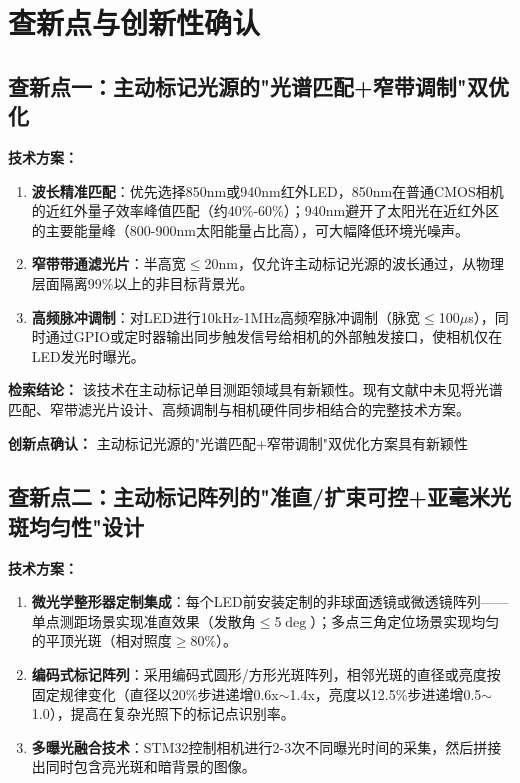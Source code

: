 \documentclass[12pt, a4paper]{ctexart}
\begin{document}
\section{查新点与创新性确认}

\subsection{查新点一：主动标记光源的"光谱匹配+窄带调制"双优化}

\textbf{技术方案：}

\begin{enumerate}
\item \textbf{波长精准匹配}：优先选择850nm或940nm红外LED，850nm在普通CMOS相机的近红外量子效率峰值匹配（约40\%-60\%）；940nm避开了太阳光在近红外区的主要能量峰（800-900nm太阳能量占比高），可大幅降低环境光噪声。

\item \textbf{窄带带通滤光片}：半高宽$\le$20nm，仅允许主动标记光源的波长通过，从物理层面隔离99\%以上的非目标背景光。

\item \textbf{高频脉冲调制}：对LED进行10kHz-1MHz高频窄脉冲调制（脉宽$\le$100$\mu$s），同时通过GPIO或定时器输出同步触发信号给相机的外部触发接口，使相机仅在LED发光时曝光。
\end{enumerate}

\textbf{检索结论：} 该技术在主动标记单目测距领域具有新颖性。现有文献中未见将光谱匹配、窄带滤光片设计、高频调制与相机硬件同步相结合的完整技术方案。

\textbf{创新点确认：} 主动标记光源的"光谱匹配+窄带调制"双优化方案具有新颖性

\subsection{查新点二：主动标记阵列的"准直/扩束可控+亚毫米光斑均匀性"设计}

\textbf{技术方案：}

\begin{enumerate}
\item \textbf{微光学整形器定制集成}：每个LED前安装定制的非球面透镜或微透镜阵列——单点测距场景实现准直效果（发散角$\le$5$\deg$）；多点三角定位场景实现均匀的平顶光斑（相对照度$\ge$80\%）。

\item \textbf{编码式标记阵列}：采用编码式圆形/方形光斑阵列，相邻光斑的直径或亮度按固定规律变化（直径以20\%步进递增0.6x$\sim$1.4x，亮度以12.5\%步进递增0.5$\sim$1.0），提高在复杂光照下的标记点识别率。

\item \textbf{多曝光融合技术}：STM32控制相机进行2-3次不同曝光时间的采集，然后拼接出同时包含亮光斑和暗背景的图像。
\end{enumerate}
\end{document}
